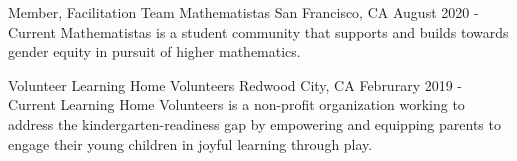 \documentclass[../omelveny-cv]{subfiles}
\begin{document}


\begin{cventries}
    \cventry
    {Member, Facilitation Team} %
    {Mathematistas} %
    {San Francisco, CA} %
    {August 2020 - Current} %
    {
        Mathematistas is a student community that supports and builds towards gender equity in pursuit of higher mathematics.
    }


    \cventry
    {Volunteer} %
    {Learning Home Volunteers} %
    {Redwood City, CA} %
    {Februrary 2019 - Current} %
    {
        Learning Home Volunteers is a non-profit organization working to address the kindergarten-readiness gap by empowering and equipping parents to engage their young children in joyful learning through play.
    }


\end{cventries}
\end{document}
